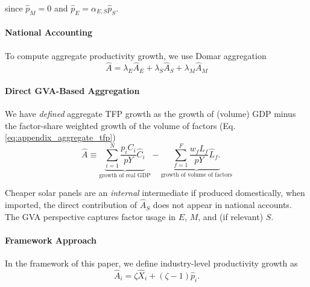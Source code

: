 \documentclass[11pt]{article}
\begin{document}
since $\hat{p}_M=0$ and $\hat{p}_E=\alpha_{E,S}\hat{p}_S$.


\paragraph{National Accounting} To compute aggregate productivity growth, we use Domar aggregation
\begin{equation}
    \hat{A}=\lambda_E\hat{A}_E+\lambda_S\hat{A}_S+\lambda_M\hat{A}_M
\end{equation}

\paragraph{Direct GVA-Based Aggregation} We have \textit{defined} aggregate TFP growth as the growth of (volume) GDP minus the factor-share weighted growth of the volume of factors (Eq. \ref{eq:appendix_aggregate_tfp})
\begin{equation}
\hat{A} \equiv \underbrace{\sum_{i=1}^N \frac{p_iC_i}{pY} \hat{C}_i}_{\text{growth of real GDP}} - \underbrace{\sum_{f=1}^F \frac{w_f L_f}{pY} \hat{L}_f.}_{\text{growth of volume of factors}}
\end{equation}

Cheaper solar panels are an \emph{internal} intermediate if produced domestically, when imported, the direct contribution of $\hat{A}_S$ does not appear in national accounts. The GVA perspective captures factor usage in $E$, $M$, and (if relevant) $S$.

\paragraph{Framework Approach}
In the framework of this paper, we define industry-level productivity growth as
\begin{equation}
    \hat{A}_i=\zeta\hat{X}_i+(\zeta-1)\hat{p}_i.
\end{equation}


\end{document}
